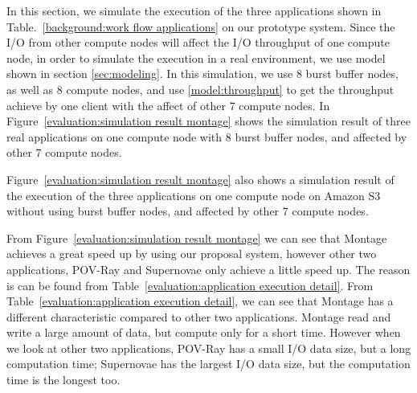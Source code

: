  In this section, we simulate the execution of the three applications shown in
 Table.~\ref{background:work flow applications} on our prototype system.
 Since the I/O from other compute nodes will affect the I/O throughput of one compute node,
 in order to simulate the execution in a real environment, we use model shown in section
 \ref{sec:modeling}.
 In this simulation, we use 8 burst buffer nodes, as well as 8 compute nodes, and use
 \ref{model:throughput} to get the throughput achieve by one client with the affect of other 7 compute nodes.
 In Figure~\ref{evaluation:simulation result montage} shows the simulation result of three real
 applications on one compute node with 8 burst buffer nodes, and affected by other 7 compute nodes.
 
 Figure~\ref{evaluation:simulation result montage} also shows a simulation result of the execution
 of the three applications on one compute node on Amazon S3 without using burst buffer nodes, and
 affected by other 7 compute nodes.
 
 From Figure~\ref{evaluation:simulation result montage} we can see that Montage achieves a great
 speed up by using our proposal system, however other two applications, POV-Ray and Supernovae only
 achieve a little speed up.
 The reason is can be found from Table~\ref{evaluation:application execution detail}.
 From Table~\ref{evaluation:application execution detail}, we can see that Montage has a different
 characteristic compared to other two applications.
 Montage read and write a large amount of data, but compute only for a short time.
 However when we look at other two applications, POV-Ray has a small I/O data size, but a long
 computation time; Supernovae has the largest I/O data size, but the computation time is the longest
 too.
 
